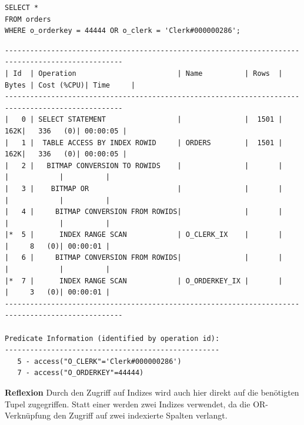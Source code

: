 \documentclass[10pt]{article}
\begin{document}
\begin{lstlisting}[style=sql]
SELECT *
FROM orders
WHERE o_orderkey = 44444 OR o_clerk = 'Clerk#000000286';
\end{lstlisting}
\begin{lstlisting}[style=queryexecutionplanSmall]
--------------------------------------------------------------------------------------------------
| Id  | Operation                        | Name          | Rows  | Bytes | Cost (%CPU)| Time     |
--------------------------------------------------------------------------------------------------
|   0 | SELECT STATEMENT                 |               |  1501 |   162K|   336   (0)| 00:00:05 |
|   1 |  TABLE ACCESS BY INDEX ROWID     | ORDERS        |  1501 |   162K|   336   (0)| 00:00:05 |
|   2 |   BITMAP CONVERSION TO ROWIDS    |               |       |       |            |          |
|   3 |    BITMAP OR                     |               |       |       |            |          |
|   4 |     BITMAP CONVERSION FROM ROWIDS|               |       |       |            |          |
|*  5 |      INDEX RANGE SCAN            | O_CLERK_IX    |       |       |     8   (0)| 00:00:01 |
|   6 |     BITMAP CONVERSION FROM ROWIDS|               |       |       |            |          |
|*  7 |      INDEX RANGE SCAN            | O_ORDERKEY_IX |       |       |     3   (0)| 00:00:01 |
--------------------------------------------------------------------------------------------------

Predicate Information (identified by operation id):
---------------------------------------------------
   5 - access("O_CLERK"='Clerk#000000286')
   7 - access("O_ORDERKEY"=44444)
\end{lstlisting}
\textbf{Reflexion} \newline
Durch den Zugriff auf Indizes wird auch hier direkt auf die benötigten Tupel zugegriffen.
Statt einer werden zwei Indizes verwendet, da die OR-Verknüpfung den Zugriff auf zwei indexierte Spalten verlangt.
\end{document}
